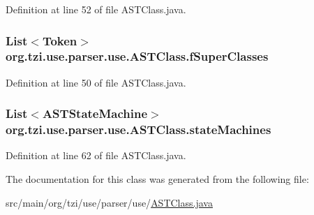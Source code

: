 Definition at line 52 of file A\-S\-T\-Class.\-java.

\hypertarget{classorg_1_1tzi_1_1use_1_1parser_1_1use_1_1_a_s_t_class_a35b71bf1905c82b57cc223433bbedcb0}{
\subsubsection[{f\-Super\-Classes}]{\setlength{\rightskip}{0pt plus 5cm}List$<$Token$>$ org.\-tzi.\-use.\-parser.\-use.\-A\-S\-T\-Class.\-f\-Super\-Classes\hspace{0.3cm}{\ttfamily [protected]}}}\label{classorg_1_1tzi_1_1use_1_1parser_1_1use_1_1_a_s_t_class_a35b71bf1905c82b57cc223433bbedcb0}


Definition at line 50 of file A\-S\-T\-Class.\-java.

\hypertarget{classorg_1_1tzi_1_1use_1_1parser_1_1use_1_1_a_s_t_class_a145267a1569b153cbf1b845e0a687036}{
\subsubsection[{state\-Machines}]{\setlength{\rightskip}{0pt plus 5cm}List$<${\bf A\-S\-T\-State\-Machine}$>$ org.\-tzi.\-use.\-parser.\-use.\-A\-S\-T\-Class.\-state\-Machines\hspace{0.3cm}{\ttfamily [protected]}}}\label{classorg_1_1tzi_1_1use_1_1parser_1_1use_1_1_a_s_t_class_a145267a1569b153cbf1b845e0a687036}


Definition at line 62 of file A\-S\-T\-Class.\-java.



The documentation for this class was generated from the following file\-:\begin{DoxyCompactItemize}
\item 
src/main/org/tzi/use/parser/use/\hyperlink{_a_s_t_class_8java}{A\-S\-T\-Class.\-java}\end{DoxyCompactItemize}
